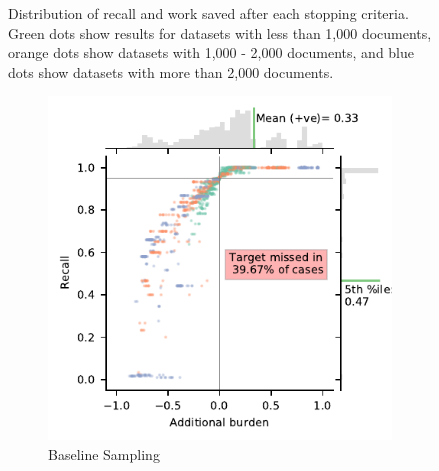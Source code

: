 \documentclass{bmcart}
\begin{document}
\begin{figure}
	\caption{\small Distribution of recall and work saved after each stopping criteria. Green dots show results for datasets with less than 1,000 documents, orange dots show datasets with 1,000 - 2,000 documents, and blue dots show datasets with more than 2,000 documents.} 
	\label{recall-wss}
\end{figure}

\begin{figure}
	\centering
	\begin{subfigure}[b]{0.475\textwidth}
		\centering
		\includegraphics[width=\textwidth]{../images/jointplot_burden_bir}
		\caption[Network2]%
		{{\small Baseline Sampling}}    
		\label{fig:bir_ab}
	\end{subfigure}
	\hfill
	\begin{subfigure}[b]{0.475\textwidth}  
		\centering 

\end{subfigure}
\end{figure}
\end{document}
